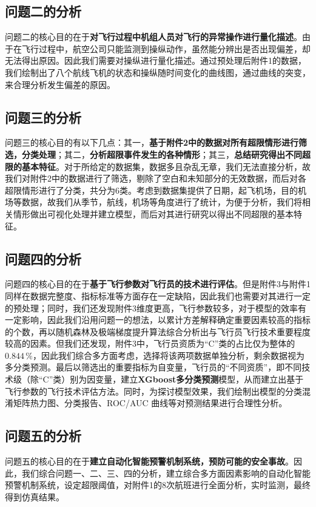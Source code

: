 \documentclass{MathorCupModeling}
\begin{document}
	\subsection{问题二的分析}
	问题二的核心目的在于\textbf{对飞行过程中机组人员对飞行的异常操作进行量化描述}。由于在飞行过程中，航空公司只能监测到操纵动作，虽然能分辨出是否出现偏差，却无法得出原因。因此我们需要对操纵进行量化描述。通过预处理后附件1的数据，我们绘制出了八个航线飞机的状态和操纵随时间变化的曲线图，通过曲线的突变，来合理分析发生偏差的原因。
	\subsection{问题三的分析}
	问题三的核心目的有以下几点：{\heiti 其一}，\textbf{基于附件2中的数据对所有超限情形进行筛选，分类处理}；{\heiti 其二}，\textbf{分析超限事件发生的各种情形}；{\heiti 其三}，\textbf{总结研究得出不同超限的基本特征}。对于所给定的数据集，数据多且杂乱无章，我们无法直接分析，故我们对附件2中的数据进行了筛选，剔除了空白和未知部分的无效数据，而后对各超限情形进行了分类，共分为6类。考虑到数据集提供了日期，起飞机场，目的机场等数据，故我们从季节，航线，机场等角度进行了统计，为便于分析，我们将相关情形做出可视化处理并建立模型，而后对其进行研究以得出不同超限的基本特征。
	\subsection{问题四的分析}
	问题四的核心目的在于\textbf{基于飞行参数对飞行员的技术进行评估}。但是附件3与附件1同样在数据完整度、指标标准等方面存在一定缺陷，因此我们也需要对其进行一定的预处理；同时，我们还发现附件3维度更高，飞行参数较多，对于模型的效率有一定影响，因此我们沿用问题一的想法，以累计方差解释确定重要因素较高的指标的个数，再以随机森林及极端梯度提升算法综合分析出与飞行员飞行技术重要程度较高的因素。但我们还发现，附件3中，飞行员资质为“C”类的占比仅为整体的$\boldsymbol{0.844\,\%}$，因此我们综合多方面考虑，选择将该两项数据单独分析，剩余数据视为多分类预测。最后以筛选出的重要指标为自变量，飞行员的“不同资质”，即不同技术级（除“C”类）别为因变量，建立\textbf{XGboost多分类预测}模型，从而建立出基于飞行参数的飞行技术评估方法。同时，为探讨模型效果，我们绘制出模型的{\heiti 分类混淆矩阵热力图}、{\heiti 分类报告}、{\heiti ROC/AUC	曲线}等对预测结果进行合理性分析。
	\subsection{问题五的分析}
	问题五的核心目的在于\textbf{建立自动化智能预警机制系统，预防可能的安全事故}。因此，我们综合问题一、二、三、四的分析，建立综合多方面因素影响的自动化智能预警机制系统，设定超限阈值，对附件1的8次航班进行全面分析，实时监测，最终得到仿真结果。
\end{document}
